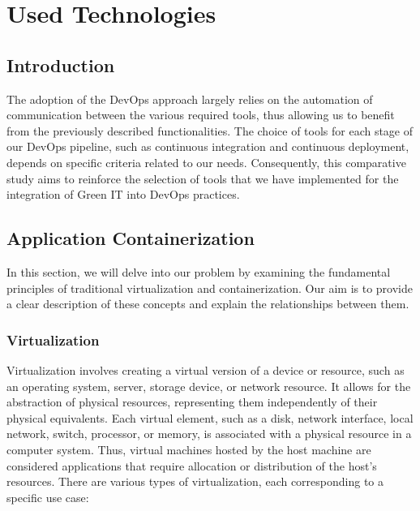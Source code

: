 \chapter{Used Technologies}
\label{chap:Chapter 3 title}

\section{Introduction}
The adoption of the DevOps approach largely relies on the automation of communication between the various required tools, thus allowing us to benefit from the previously described functionalities. The choice of tools for each stage of our DevOps pipeline, such as continuous integration and continuous deployment, depends on specific criteria related to our needs. Consequently, this comparative study aims to reinforce the selection of tools that we have implemented for the integration of Green IT into DevOps practices.

\newpage


\section{Application Containerization}
In this section, we will delve into our problem by examining the fundamental principles of traditional virtualization and containerization. Our aim is to provide a clear description of these concepts and explain the relationships between them.

\subsection{Virtualization}
Virtualization involves creating a virtual version of a device or resource, such as an operating system, server, storage device, or network resource. It allows for the abstraction of physical resources, representing them independently of their physical equivalents. Each virtual element, such as a disk, network interface, local network, switch, processor, or memory, is associated with a physical resource in a computer system. Thus, virtual machines hosted by the host machine are considered applications that require allocation or distribution of the host's resources. There are various types of virtualization, each corresponding to a specific use case:

